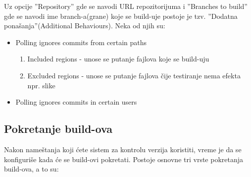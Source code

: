 Uz opcije ''Repository'' gde se navodi URL repozitorijuma i ''Branches to build'' gde se navodi ime branch-a(grane) koje se build-uje postoje je tzv. ''Dodatna ponašanja''(Additional Behaviours). Neka od njih su:
 
\begin{itemize}  
\item Polling ignores commits from certain paths
\begin{enumerate}
\item Included regions - unose se putanje fajlova koje se build-uju
\item Excluded regions - unose se putanje fajlova čije testiranje nema efekta npr. slike
\end{enumerate}
\item Polling ignores commits in certain users 
\end{itemize}

\subsection{Pokretanje build-ova}

Nakon nameštanja koji ćete sistem za kontrolu verzija koristiti, vreme je da se konfiguriše kada će se build-ovi pokretati. Postoje osnovne tri vrste pokretanja build-ova, a to su:


